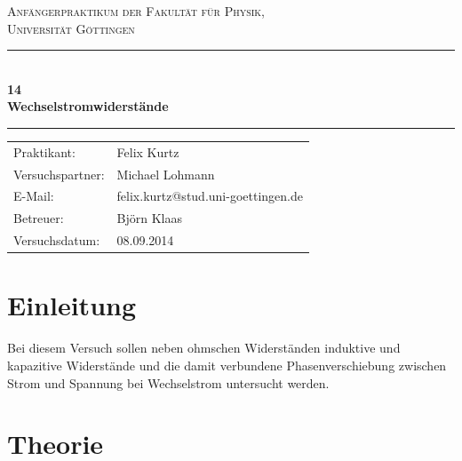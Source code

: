 \documentclass[12pt,a4paper,titlepage,headinclude,bibtotoc]{scrartcl}
\begin{document}
\begin{titlepage}
\centering
\textsc{\Large Anfängerpraktikum der Fakultät für
  Physik,\\[1.5ex] Universität Göttingen}

\vspace*{4.2cm}

\rule{\textwidth}{1pt}\\[0.5cm]
{\huge \bfseries
  14\\[1.5ex]
  Wechselstromwiderstände}\\[0.5cm]
\rule{\textwidth}{1pt}

\vspace*{2.5cm}

\begin{Large}
\begin{tabular}{ll}
Praktikant: & Felix Kurtz\\
Versuchspartner: & Michael Lohmann\\
 E-Mail: &  felix.kurtz@stud.uni-goettingen.de\\
 Betreuer: & Björn Klaas\\
 Versuchsdatum: & 08.09.2014\\
\end{tabular}
\end{Large}

\vspace*{0.8cm}

\begin{Large}
\end{Large}

\end{titlepage}

\tableofcontents

\newpage

\section{Einleitung}
\label{sec:einleitung}
Bei diesem Versuch sollen neben ohmschen Widerständen induktive und kapazitive Widerstände und die damit verbundene Phasenverschiebung zwischen Strom und Spannung bei Wechselstrom untersucht werden.

\section{Theorie}
\label{sec:theorie}
\end{document}
